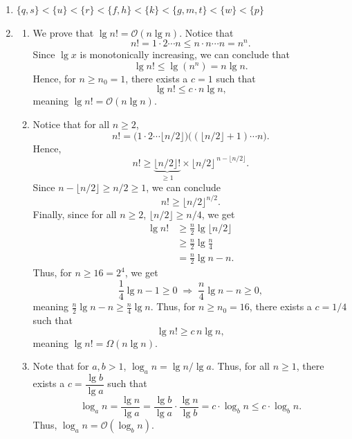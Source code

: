 \documentclass[12pt]{article}
\begin{document}
\begin{enumerate}
  \item $\{q, s\} < \{u\} < \{r\} < \{f, h\} < \{k\} < \{g, m, t\} <
    \{w\} < \{p\}$

  \item
    \begin{enumerate}
      \item We prove that $\lg n! = \mathcal O(n \lg n)$. Notice that
        $$
        n! = 1 \cdot 2 \cdots n \leq n \cdot n \cdots n = n^n.
        $$
        Since $\lg x$ is monotonically increasing, we can conclude that
        $$
        \lg n! \leq \lg (n^{n}) = n \lg n.
        $$
        Hence, for $n \geq n_0 = 1$, there exists a $c = 1$ such that
        $$
        \lg n! \leq c \cdot n \lg n,
        $$
        meaning $\lg n! = \mathcal O(n \lg n)$.

      \item Notice that for all $n \geq 2$,
        $$
        n! = \big(1 \cdot 2 \cdots \lfloor n/2 \rfloor\big)
        \big((\lfloor n/2 \rfloor + 1) \cdots n\big).
        $$
        Hence,
        $$
        n! \geq \underbrace{\lfloor n/2\rfloor!}_{\geq 1}
        \times \lfloor n/2 \rfloor^{\,n - \lfloor n/2 \rfloor}.
        $$
        Since $n - \lfloor n/2 \rfloor \geq n/2 \geq 1$, we can conclude
        $$
        n! \geq \lfloor n/2 \rfloor^{n/2}.
        $$
        Finally, since for all $n \geq 2$, $\lfloor n/2 \rfloor \geq
        n/4$, we get
        \begin{align*}
          \lg n! &\geq \frac{n}{2} \lg \lfloor n/2 \rfloor \\
          &\geq \frac{n}{2} \lg \frac{n}{4} \\
          &= \frac{n}{2} \lg n - n.
        \end{align*}
        Thus, for $n \geq 16 = 2^4$, we get
        $$
        \frac{1}{4} \lg n - 1 \geq 0 \;\Rightarrow\; \frac{n}{4} \lg
        n - n \geq 0,
        $$
        meaning $\frac{n}{2} \lg n - n \geq \frac{n}{4} \lg n$. Thus, for
        $n \geq n_0 = 16$, there exists a $c = 1/4$ such that
        $$
        \lg n! \geq c \, n \lg n,
        $$
        meaning $\lg n! = \Omega(n \lg n)$.

      \item Note that for $a, b > 1$, $\log_a n = \lg n / \lg a$. Thus, for all
        $n \geq 1$, there exists a $c = \dfrac{\lg b}{\lg a}$ such that
        $$
        \log_a n = \frac{\lg n}{\lg a}
        = \frac{\lg b}{\lg a} \cdot \frac{\lg n}{\lg b}
        = c \cdot \log_b n
        \leq c \cdot \log_b n.
        $$
        Thus, $\log_a n = \mathcal O(\log_b n)$.
    \end{enumerate}


\end{enumerate}
\end{document}
